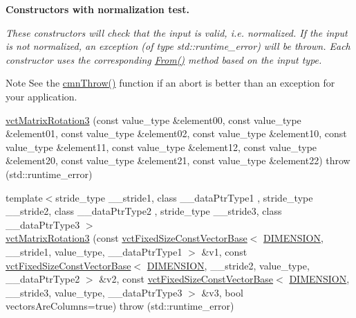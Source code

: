 \begin{Indent}{\bf Constructors with normalization test.}\par
{\em These constructors will check that the input is valid, i.\-e. normalized. If the input is not normalized, an exception (of type {\ttfamily std\-::runtime\-\_\-error}) will be thrown. Each constructor uses the corresponding \hyperlink{classvct_matrix_rotation3_base_afb96603eae3080e013984aa908408f73}{From()} method based on the input type.

\begin{DoxyNote}{Note}
See the \hyperlink{_minimal_cmn_8h_ad50e82cf9c9dbd0e6443c13e0d1a6f1a}{cmn\-Throw()} function if an {\ttfamily abort} is better than an exception for your application. 
\end{DoxyNote}
}\begin{DoxyCompactItemize}
\item 
\hyperlink{classvct_matrix_rotation3_ae2a44894c83fefe6d98ab78ac56b1ef6}{vct\-Matrix\-Rotation3} (const value\-\_\-type \&element00, const value\-\_\-type \&element01, const value\-\_\-type \&element02, const value\-\_\-type \&element10, const value\-\_\-type \&element11, const value\-\_\-type \&element12, const value\-\_\-type \&element20, const value\-\_\-type \&element21, const value\-\_\-type \&element22)  throw (std\-::runtime\-\_\-error)
\item 
{\footnotesize template$<$stride\-\_\-type \-\_\-\-\_\-stride1, class \-\_\-\-\_\-data\-Ptr\-Type1 , stride\-\_\-type \-\_\-\-\_\-stride2, class \-\_\-\-\_\-data\-Ptr\-Type2 , stride\-\_\-type \-\_\-\-\_\-stride3, class \-\_\-\-\_\-data\-Ptr\-Type3 $>$ }\\\hyperlink{classvct_matrix_rotation3_af830f0e91dda43d4197ead0e4627ee8e}{vct\-Matrix\-Rotation3} (const \hyperlink{classvct_fixed_size_const_vector_base}{vct\-Fixed\-Size\-Const\-Vector\-Base}$<$ \hyperlink{classvct_matrix_rotation3_aa21ad8fcafb1ab9d70efcec9bda6eab2af25ebbcafe4db62f894c21db0608cd65}{D\-I\-M\-E\-N\-S\-I\-O\-N}, \-\_\-\-\_\-stride1, value\-\_\-type, \-\_\-\-\_\-data\-Ptr\-Type1 $>$ \&v1, const \hyperlink{classvct_fixed_size_const_vector_base}{vct\-Fixed\-Size\-Const\-Vector\-Base}$<$ \hyperlink{classvct_matrix_rotation3_aa21ad8fcafb1ab9d70efcec9bda6eab2af25ebbcafe4db62f894c21db0608cd65}{D\-I\-M\-E\-N\-S\-I\-O\-N}, \-\_\-\-\_\-stride2, value\-\_\-type, \-\_\-\-\_\-data\-Ptr\-Type2 $>$ \&v2, const \hyperlink{classvct_fixed_size_const_vector_base}{vct\-Fixed\-Size\-Const\-Vector\-Base}$<$ \hyperlink{classvct_matrix_rotation3_aa21ad8fcafb1ab9d70efcec9bda6eab2af25ebbcafe4db62f894c21db0608cd65}{D\-I\-M\-E\-N\-S\-I\-O\-N}, \-\_\-\-\_\-stride3, value\-\_\-type, \-\_\-\-\_\-data\-Ptr\-Type3 $>$ \&v3, bool vectors\-Are\-Columns=true)  throw (std\-::runtime\-\_\-error)

\end{DoxyCompactItemize}
\end{Indent}
